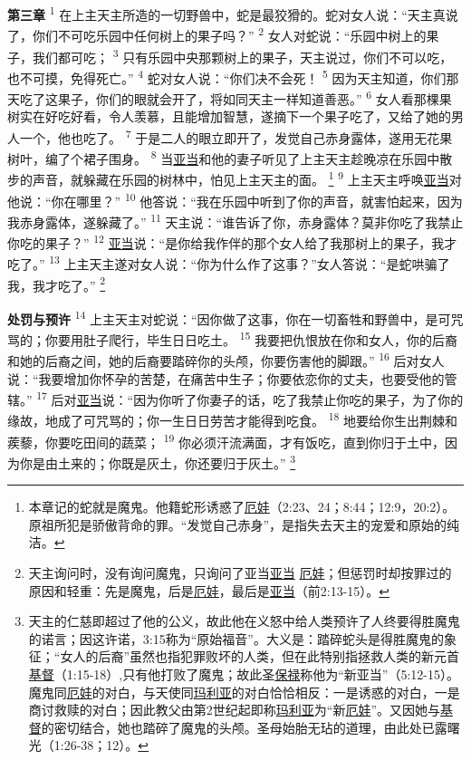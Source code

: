 \textbf{第三章\quad}
\textsuperscript{1}
在上主天主所造的一切野兽中，蛇是最狡猾的。蛇对女人说：“天主真说了，你们不可吃乐园中任何树上的果子吗？”
\textsuperscript{2}
女人对蛇说：“乐园中树上的果子，我们都可吃；
\textsuperscript{3}
只有乐园中央那颗树上的果子，天主说过，你们不可以吃，也不可摸，免得死亡。”
\textsuperscript{4}
蛇对女人说：“你们决不会死！
\textsuperscript{5}
因为天主知道，你们那天吃了这果子，你们的眼就会开了，将如同天主一样知道善恶。”
\textsuperscript{6}
女人看那棵果树实在好吃好看，令人羡慕，且能增加智慧，遂摘下一个果子吃了，又给了她的男人一个，他也吃了。
\textsuperscript{7}
于是二人的眼立即开了，发觉自己赤身露体，遂用无花果树叶，编了个裙子围身。
\textsuperscript{8}
当\uline{亚当}和他的妻子听见了上主天主趁晚凉在乐园中散步的声音，就躲藏在乐园的树林中，怕见上主天主的面。
\footnote{本章记的蛇就是魔鬼。他籍蛇形诱惑了\uline{厄娃}（2:23、24；8:44；12:9，20:2）。原祖所犯是骄傲背命的罪。“发觉自己赤身”，是指失去天主的宠爱和原始的纯洁。}
\textsuperscript{9}
上主天主呼唤\uline{亚当}对他说：“你在哪里？”
\textsuperscript{10}
他答说：“我在乐园中听到了你的声音，就害怕起来，因为我赤身露体，遂躲藏了。”
\textsuperscript{11}
天主说：“谁告诉了你，赤身露体？莫非你吃了我禁止你吃的果子？”
\textsuperscript{12}
\uline{亚当}说：“是你给我作伴的那个女人给了我那树上的果子，我才吃了。”
\textsuperscript{13}
上主天主遂对女人说：“你为什么作了这事？”女人答说：“是蛇哄骗了我，我才吃了。”
\footnote{天主询问时，没有询问魔鬼，只询问了亚当\uline{亚当} \uline{厄娃}；但惩罚时却按罪过的原因和轻重：先是魔鬼，后是\uline{厄娃}，最后是\uline{亚当}（前2:13-15）。}

\textbf{处罚与预许\quad}
\textsuperscript{14}
上主天主对蛇说：“因你做了这事，你在一切畜牲和野兽中，是可咒骂的；你要用肚子爬行，毕生日日吃土。
\textsuperscript{15}
我要把仇恨放在你和女人，你的后裔和她的后裔之间，她的后裔要踏碎你的头颅，你要伤害他的脚跟。”
\textsuperscript{16}
后对女人说：“我要增加你怀孕的苦楚，在痛苦中生子；你要依恋你的丈夫，也要受他的管辖。”
\textsuperscript{17}
后对\uline{亚当}说：“因为你听了你妻子的话，吃了我禁止你吃的果子，为了你的缘故，地成了可咒骂的；你一生日日劳苦才能得到吃食。
\textsuperscript{18}
地要给你生出荆棘和蒺藜，你要吃田间的蔬菜；
\textsuperscript{19}
你必须汗流满面，才有饭吃，直到你归于土中，因为你是由土来的；你既是灰土，你还要归于灰土。”
\footnote{天主的仁慈即超过了他的公义，故此他在义怒中给人类预许了人终要得胜魔鬼的诺言；因这许诺，3:15称为“原始福音”。大义是：踏碎蛇头是得胜魔鬼的象征；“女人的后裔”虽然也指犯罪败坏的人类，但在此特别指拯救人类的新元首\uline{基督}（1:15-18）,只有他打败了魔鬼；故此圣\uline{保禄}称他为“新亚当”（5:12-15）。魔鬼同\uline{厄娃}的对白，与天使同\uline{玛利亚}的对白恰恰相反：一是诱惑的对白，一是商讨救赎的对白；因此教父由第2世纪起即称\uline{玛利亚}为“新\uline{厄娃}”。又因她与\uline{基督}的密切结合，她也踏碎了魔鬼的头颅。圣母始胎无玷的道理，由此处已露曙光（1:26-38；12）。}

